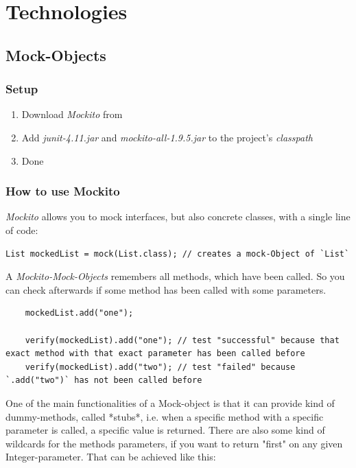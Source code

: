 \documentclass[11pt, a4paper]{article}
\begin{document}
\section{Technologies}
\subsection{Mock-Objects}
\subsubsection{Setup}

\begin{enumerate}
	\item Download \textit{Mockito} from \cite{MockitoDownload}
	\item Add \textit{junit-4.11.jar} and \textit{mockito-all-1.9.5.jar} to the project's \textit{classpath}
	\item Done
\end{enumerate}

\subsubsection{How to use Mockito}

\textit{Mockito} allows you to mock interfaces, but also concrete classes, with a single line of code:
	
\begin{lstlisting} 
List mockedList = mock(List.class); // creates a mock-Object of `List` 
\end{lstlisting}
	
A \textit{Mockito-Mock-Objects} remembers all methods, which have been called. So you can check afterwards if some method has been called with some parameters.
	
\begin{lstlisting}
	mockedList.add("one");
	    
	verify(mockedList).add("one"); // test "successful" because that exact method with that exact parameter has been called before
	verify(mockedList).add("two"); // test "failed" because `.add("two")` has not been called before
\end{lstlisting}

One of the main functionalities of a Mock-object is that it can provide kind of dummy-methods, called *stubs*, i.e. when a specific method with a specific parameter is called, a specific
value is returned. There are also some kind of wildcards for the methods parameters, if you want to return "first" on any given Integer-parameter. That can be achieved like this:
\end{document}
